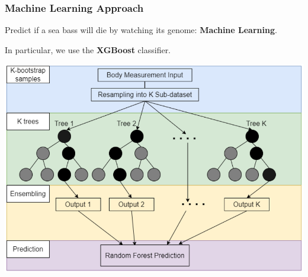 \documentclass[aspectratio=169]{beamer}
\begin{document}
\begin{frame}
\frametitle{Machine Learning Approach}
  Predict if a sea bass will die by watching its genome: \textbf{Machine Learning}.

\vspace{0.3cm}

\begin{minipage}[c]{0.5\textwidth}
  In particular, we use the \textbf{XGBoost} classifier.
\end{minipage}
\begin{minipage}[c]{0.45\textwidth}
  \includegraphics[width=0.9\linewidth]{figures/xggoost.png}
\end{minipage}
\end{frame}
\end{document}

